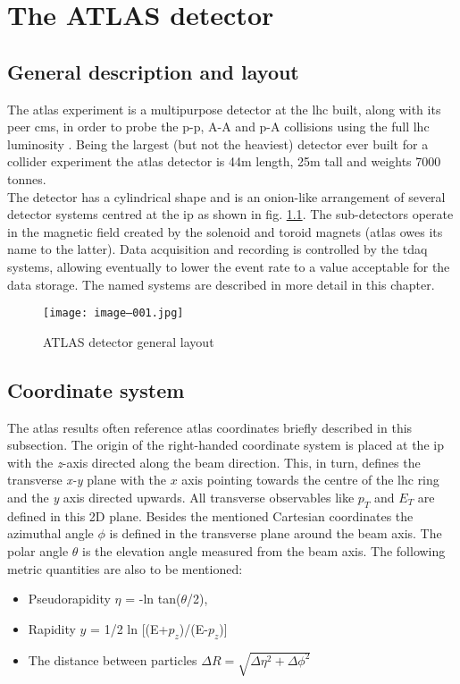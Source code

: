 \chapter{The ATLAS detector}
   
       \section{General description and layout}
    
        The \gls{atlas} experiment is a multipurpose detector at the \gls{lhc} built, along with its peer \gls{cms}, in order to probe the p-p, A-A and p-A collisions using the full \gls{lhc} luminosity \cite{atlas_experiment}. Being the largest (but not the heaviest) detector ever built for a collider experiment the \gls{atlas} detector is 44m length, 25m tall and weights 7000 tonnes. \\
        The detector has a cylindrical shape and is an onion-like arrangement of several detector systems centred at the \gls{ip} as shown in fig. \ref{fig::atlas_layout}. The sub-detectors operate in the magnetic field created by the solenoid and toroid magnets (\gls{atlas} owes its name to the latter). Data acquisition and recording is controlled by the \gls{tdaq} systems, allowing eventually to lower the event rate to a value acceptable for the data storage. The named systems are described in more detail in this chapter.
        
        
        \begin{figure}[htpb]
        		\texttt{[image: image--001.jpg]}
        		\caption{ ATLAS detector general layout}
        		\label{fig::atlas_layout}
        \end{figure}
        
        \section{Coordinate system}
        
		The \gls{atlas} results often reference \gls{atlas} coordinates briefly described in this subsection. The origin of the right-handed coordinate system is placed at the \gls{ip} with the \textit{z}-axis directed along the beam direction. This, in turn, defines the transverse \textit{x-y} plane with the $\textit{x}$ axis pointing towards the centre of the \gls{lhc} ring and the \textit{y} axis directed upwards. All transverse observables like $p_T$ and $E_T$ are defined in this 2D plane. Besides the mentioned Cartesian coordinates the azimuthal angle \textit{$\phi$} is defined in the transverse plane around the beam axis. The polar angle \textit{$\theta$} is the elevation angle measured from the beam axis. The following metric quantities are also to be mentioned:
		\begin{itemize}
		\item Pseudorapidity $\eta$ = -ln tan($\theta$/2),
		\item Rapidity $y$ = 1/2 ln [(E+$p_z$)/(E-$p_z$)]
		\item The distance between particles $\Delta R = \sqrt{\Delta \eta^2 + \Delta \phi ^2}$
		\end{itemize}
        
